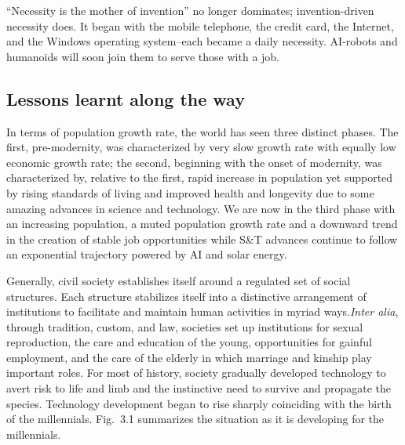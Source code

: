 \begin{multicols}{2}
“Necessity is the mother of invention” no longer dominates; invention-driven necessity does. It began with the mobile telephone, the credit card, the Internet, and the Windows operating system--each became a daily necessity. AI-robots and humanoids will soon join them to serve those with a job. 

\subsection{Lessons learnt along the way}

In terms of population growth rate, the world has seen three distinct phases. The first, pre-modernity, was characterized by very slow growth rate with equally low economic growth rate; the second, beginning with the onset of modernity, was characterized by, relative to the first, rapid increase in population yet supported by rising standards of living and improved health and longevity due to some amazing advances in science and technology. We are now in the third phase with an increasing population, a muted population growth rate and a downward trend in the creation of stable job opportunities while S\&T advances continue to follow an exponential trajectory powered by AI and solar energy.

\vskip 2pt

Generally, civil society establishes itself around a regulated set of social structures. Each structure stabilizes itself into a distinctive arrangement of institutions to facilitate and maintain human activities in myriad ways.\textit{Inter alia}, through tradition, custom, and law, societies set up institutions for sexual reproduction, the care and education of the young, opportunities for gainful employment, and the care of the elderly in which marriage and kinship play important roles. For most of history, society gradually developed technology to avert risk to life and limb and the instinctive need to survive and propagate the species. Technology development began to rise sharply coinciding with the birth of the millennials. Fig.~3.1 summarizes the situation as it is developing for the millennials. 

\vskip 2pt


\end{multicols}

